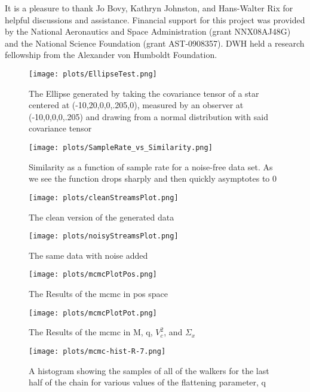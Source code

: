 \documentclass[12pt,preprint]{aastex}
\begin{document}
\acknowledgments It is a pleasure to thank Jo Bovy, Kathryn Johnston,
and Hans-Walter Rix for helpful discussions and assistance.  Financial
support for this project was provided by the National Aeronautics and
Space Administration (grant NNX08AJ48G) and the National Science
Foundation (grant AST-0908357). DWH held a research fellowship from
the Alexander von Humboldt Foundation.

\clearpage
\begin{figure}
\centering
\texttt{[image: plots/EllipseTest.png]}
\caption{The Ellipse generated by taking the covariance tensor of a star centered at (-10,20,0,0,.205,0), 
measured by an observer at (-10,0,0,0,.205) and drawing from a normal distribution with said covariance 
tensor}
\label{fig:EllipseTest}
\end{figure}

\clearpage
\begin{figure}
\centering
\texttt{[image: plots/SampleRate\_vs\_Similarity.png]}
\caption{Similarity as a function of sample rate for a noise-free data set. 
As we see the function drops sharply and then quickly asymptotes to 0}
\label{fig:samplerate_vs_similarity}
\end{figure}

\clearpage
\begin{figure}
\centering
\texttt{[image: plots/cleanStreamsPlot.png]}
\caption{The clean version of the generated data}
\label{fig:cleanStreamsPlot}
\end{figure}

\clearpage
\begin{figure}
\centering
\texttt{[image: plots/noisyStreamsPlot.png]}
\caption{The same data with noise added}
\label{fig:noisyStreamsPlot}
\end{figure}

\clearpage
\begin{figure}
\centering
\texttt{[image: plots/mcmcPlotPos.png]}
\caption{The Results of the mcmc in pos space}
\label{fig:mcmcPlotPos}
\end{figure}

\clearpage
\begin{figure}
\centering
\texttt{[image: plots/mcmcPlotPot.png]}
\caption{The Results of the mcmc in M, q, $V_c^2$, and $\Sigma_x$}
\label{fig:mcmcPlotPot}
\end{figure}

\clearpage
\begin{figure}
\centering
\texttt{[image: plots/mcmc-hist-R-7.png]}
\caption{A histogram showing the samples of all of the walkers for the last half of the chain for various 
values of the flattening parameter, q}
\label{fig:mcmchistq}
\end{figure}
\end{document}
